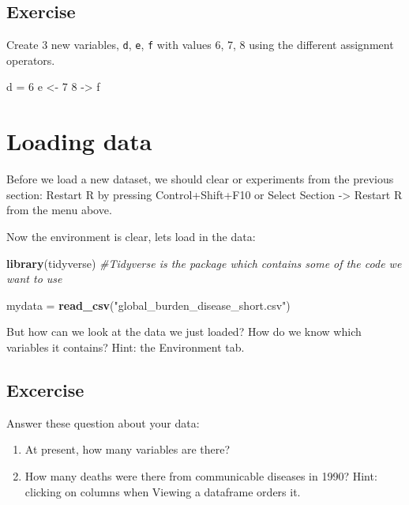 \documentclass[]{book}
\makeatletter
\newenvironment{Shaded}{\begin{snugshade}}{\end{snugshade}}
\newcommand{\KeywordTok}[1]{\textcolor[rgb]{0.13,0.29,0.53}{\textbf{#1}}}
\newcommand{\DecValTok}[1]{\textcolor[rgb]{0.00,0.00,0.81}{#1}}
\newcommand{\StringTok}[1]{\textcolor[rgb]{0.31,0.60,0.02}{#1}}
\newcommand{\CommentTok}[1]{\textcolor[rgb]{0.56,0.35,0.01}{\textit{#1}}}
\newcommand{\NormalTok}[1]{#1}
\newenvironment{kframe}{%
\medskip{}
\setlength{\fboxsep}{.8em}
 \def\at@end@of@kframe{}%
 \ifinner\ifhmode%
  \def\at@end@of@kframe{\end{minipage}}%
  \begin{minipage}{\columnwidth}%
 \fi\fi%
 \def\FrameCommand##1{\hskip\@totalleftmargin \hskip-\fboxsep
 \colorbox{shadecolor}{##1}\hskip-\fboxsep
     \hskip-\linewidth \hskip-\@totalleftmargin \hskip\columnwidth}%
 \MakeFramed {\advance\hsize-\width
   \@totalleftmargin\z@ \linewidth\hsize
   \@setminipage}}%
 {\par\unskip\endMakeFramed%
 \at@end@of@kframe}
\renewenvironment{Shaded}{\begin{kframe}}{\end{kframe}}
\makeatother
\begin{document}
\subsection{Exercise}\label{exercise-3}

Create 3 new variables, \texttt{d}, \texttt{e}, \texttt{f} with values
6, 7, 8 using the different assignment operators.

\begin{Shaded}
\begin{Highlighting}[]
\NormalTok{d  =}\StringTok{ }\DecValTok{6}
\NormalTok{e <-}\StringTok{ }\DecValTok{7}
\DecValTok{8}\NormalTok{ ->}\StringTok{ }\NormalTok{f}
\end{Highlighting}
\end{Shaded}

\section{Loading data}\label{loading-data}

Before we load a new dataset, we should clear or experiments from the
previous section: Restart R by pressing Control+Shift+F10 or Select
Section -\textgreater{} Restart R from the menu above.

Now the environment is clear, lets load in the data:

\begin{Shaded}
\begin{Highlighting}[]
\KeywordTok{library}\NormalTok{(tidyverse) }\CommentTok{#Tidyverse is the package which contains some of the code we want to use}

\NormalTok{mydata =}\StringTok{ }\KeywordTok{read_csv}\NormalTok{(}\StringTok{"global_burden_disease_short.csv"}\NormalTok{)}
\end{Highlighting}
\end{Shaded}

But how can we look at the data we just loaded? How do we know which
variables it contains? Hint: the Environment tab.

\subsection{Excercise}\label{excercise}

Answer these question about your data:

\begin{enumerate}
\def\labelenumi{\arabic{enumi}.}
\item
  At present, how many variables are there?
\item
  How many deaths were there from communicable diseases in 1990? Hint:
  clicking on columns when Viewing a dataframe orders it.
\end{enumerate}
\end{document}
